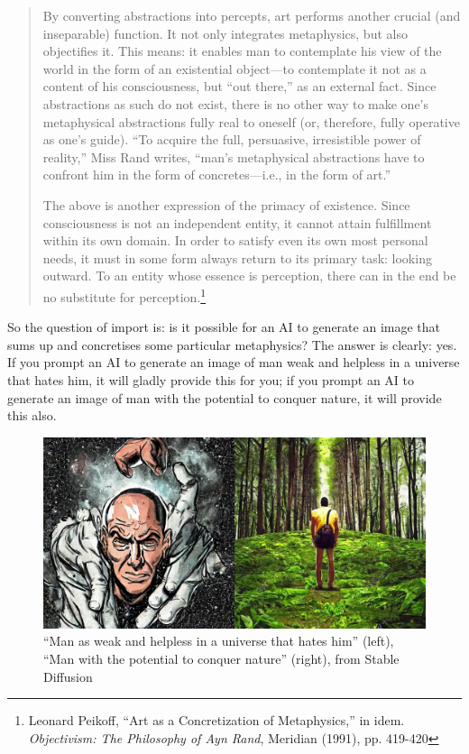 \documentclass[11pt]{article}
\begin{document}
\begin{quote}
By converting abstractions into percepts, art performs another crucial (and inseparable) function. It not only integrates metaphysics, but also objectifies it. This means: it enables man to contemplate his view of the world in the form of an existential object—to contemplate it not as a content of his consciousness, but ``out there,'' as an external fact. Since abstractions as such do not exist, there is no other way to make one's metaphysical abstractions fully real to oneself (or, therefore, fully operative as one's guide). ``To acquire the full, persuasive, irresistible power of reality,'' Miss Rand writes, ``man's metaphysical abstractions have to confront him in the form of concretes—i.e., in the form of art.''

The above is another expression of the primacy of existence. Since consciousness is not an independent entity, it cannot attain fulfillment within its own domain. In order to satisfy even its own most personal needs, it must in some form always return to its primary task: looking outward. To an entity whose essence is perception, there can in the end be no substitute for perception.\footnote{Leonard Peikoff, ``Art as a Concretization of Metaphysics,'' in idem. \emph{Objectivism: The Philosophy of Ayn Rand}, Meridian (1991), pp. 419-420}
\end{quote}

So the question of import is: is it possible for an AI to generate an image that sums up and concretises some particular metaphysics? The answer is clearly: yes. If you prompt an AI to generate an image of man weak and helpless in a universe that hates him, it will gladly provide this for you; if you prompt an AI to generate an image of man with the potential to conquer nature, it will provide this also.

\begin{figure}[htbp]
\centering
\includegraphics[width=.9\linewidth]{./images/stablediffusion-on-man.png}
\caption{``Man as weak and helpless in a universe that hates him'' (left),  ``Man with the potential to conquer nature'' (right), from Stable Diffusion}
\end{figure}
\end{document}
